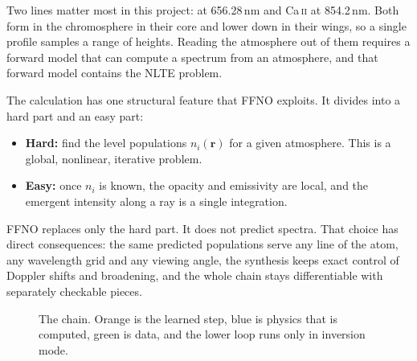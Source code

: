 Two lines matter most in this project: \Halpha{} at 656.28\,nm and Ca\,\textsc{ii} at 854.2\,nm. Both form in the chromosphere in their core and lower down in their wings, so a single profile samples a range of heights. Reading the atmosphere out of them requires a forward model that can compute a spectrum from an atmosphere, and that forward model contains the NLTE problem.

The calculation has one structural feature that FFNO exploits. It divides into a hard part and an easy part:

\begin{itemize}
\item \textbf{Hard:} find the level populations $n_i(\mathbf r)$ for a given atmosphere. This is a global, nonlinear, iterative problem.
\item \textbf{Easy:} once $n_i$ is known, the opacity and emissivity are local, and the emergent intensity along a ray is a single integration.
\end{itemize}

FFNO replaces only the hard part. It does not predict spectra. That choice has direct consequences: the same predicted populations serve any line of the atom, any wavelength grid and any viewing angle, the synthesis keeps exact control of Doppler shifts and broadening, and the whole chain stays differentiable with separately checkable pieces.

\begin{figure}[H]\centering
{}
\caption{The chain. Orange is the learned step, blue is physics that is computed, green is data, and the lower loop runs only in inversion mode.}\label{fig:chain}
\end{figure}


